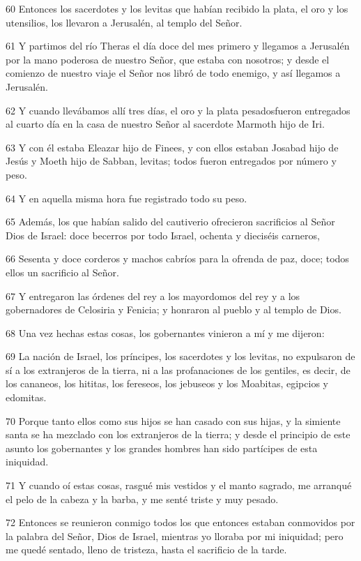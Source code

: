\par 60 Entonces los sacerdotes y los levitas que habían recibido la plata, el oro y los utensilios, los llevaron a Jerusalén, al templo del Señor.
\par 61 Y partimos del río Theras el día doce del mes primero y llegamos a Jerusalén por la mano poderosa de nuestro Señor, que estaba con nosotros; y desde el comienzo de nuestro viaje el Señor nos libró de todo enemigo, y así llegamos a Jerusalén.
\par 62 Y cuando llevábamos allí tres días, el oro y la plata pesados ​​fueron entregados al cuarto día en la casa de nuestro Señor al sacerdote Marmoth hijo de Iri.
\par 63 Y con él estaba Eleazar hijo de Finees, y con ellos estaban Josabad hijo de Jesús y Moeth hijo de Sabban, levitas; todos fueron entregados por número y peso.
\par 64 Y en aquella misma hora fue registrado todo su peso.
\par 65 Además, los que habían salido del cautiverio ofrecieron sacrificios al Señor Dios de Israel: doce becerros por todo Israel, ochenta y dieciséis carneros,
\par 66 Sesenta y doce corderos y machos cabríos para la ofrenda de paz, doce; todos ellos un sacrificio al Señor.
\par 67 Y entregaron las órdenes del rey a los mayordomos del rey y a los gobernadores de Celosiria y Fenicia; y honraron al pueblo y al templo de Dios.
\par 68 Una vez hechas estas cosas, los gobernantes vinieron a mí y me dijeron:
\par 69 La nación de Israel, los príncipes, los sacerdotes y los levitas, no expulsaron de sí a los extranjeros de la tierra, ni a las profanaciones de los gentiles, es decir, de los cananeos, los hititas, los fereseos, los jebuseos y los Moabitas, egipcios y edomitas.
\par 70 Porque tanto ellos como sus hijos se han casado con sus hijas, y la simiente santa se ha mezclado con los extranjeros de la tierra; y desde el principio de este asunto los gobernantes y los grandes hombres han sido partícipes de esta iniquidad.
\par 71 Y cuando oí estas cosas, rasgué mis vestidos y el manto sagrado, me arranqué el pelo de la cabeza y la barba, y me senté triste y muy pesado.
\par 72 Entonces se reunieron conmigo todos los que entonces estaban conmovidos por la palabra del Señor, Dios de Israel, mientras yo lloraba por mi iniquidad; pero me quedé sentado, lleno de tristeza, hasta el sacrificio de la tarde.
